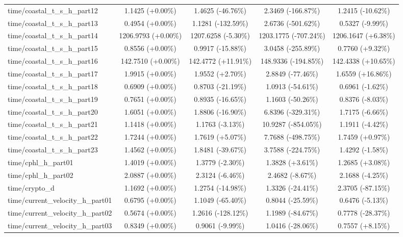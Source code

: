 \begin{table}[htbp]
{\begin{tabular}{lcccc}
time/coastal\_t\_s\_h\_part12 & 1.1425 (+0.00\%) & 1.4625 (-46.76\%) & 2.3469 (-166.87\%) & 1.2415 (-10.62\%) \\
time/coastal\_t\_s\_h\_part13 & 0.4954 (+0.00\%) & 1.1281 (-132.59\%) & 2.6736 (-501.62\%) & 0.5327 (-9.99\%) \\
time/coastal\_t\_s\_h\_part14 & 1206.9793 (+0.00\%) & 1207.6258 (-5.30\%) & 1203.1775 (-707.24\%) & 1206.1647 (+6.38\%) \\
time/coastal\_t\_s\_h\_part15 & 0.8556 (+0.00\%) & 0.9917 (-15.88\%) & 3.0458 (-255.89\%) & 0.7760 (+9.32\%) \\
time/coastal\_t\_s\_h\_part16 & 142.7510 (+0.00\%) & 142.4772 (+11.91\%) & 148.9336 (-194.85\%) & 142.4338 (+10.65\%) \\
time/coastal\_t\_s\_h\_part17 & 1.9915 (+0.00\%) & 1.9552 (+2.70\%) & 2.8849 (-77.46\%) & 1.6559 (+16.86\%) \\
time/coastal\_t\_s\_h\_part18 & 0.6909 (+0.00\%) & 0.8703 (-21.19\%) & 1.0913 (-54.61\%) & 0.6961 (-1.62\%) \\
time/coastal\_t\_s\_h\_part19 & 0.7651 (+0.00\%) & 0.8935 (-16.65\%) & 1.1603 (-50.26\%) & 0.8376 (-8.03\%) \\
time/coastal\_t\_s\_h\_part20 & 1.6051 (+0.00\%) & 1.8806 (-16.90\%) & 6.8396 (-329.31\%) & 1.7175 (-6.66\%) \\
time/coastal\_t\_s\_h\_part21 & 1.1418 (+0.00\%) & 1.1763 (-3.13\%) & 10.9287 (-854.05\%) & 1.1911 (-4.42\%) \\
time/coastal\_t\_s\_h\_part22 & 1.7244 (+0.00\%) & 1.7619 (+5.07\%) & 7.7688 (-498.75\%) & 1.7459 (+0.97\%) \\
time/coastal\_t\_s\_h\_part23 & 1.4562 (+0.00\%) & 1.8481 (-39.67\%) & 3.7588 (-224.75\%) & 1.4292 (-1.58\%) \\
time/cphl\_h\_part01 & 1.4019 (+0.00\%) & 1.3779 (-2.30\%) & 1.3828 (+3.61\%) & 1.2685 (+3.08\%) \\
time/cphl\_h\_part02 & 2.0887 (+0.00\%) & 2.3124 (-6.46\%) & 2.4682 (-8.67\%) & 2.1688 (-4.25\%) \\
time/crypto\_d & 1.1692 (+0.00\%) & 1.2754 (-14.98\%) & 1.3326 (-24.41\%) & 2.3705 (-87.15\%) \\
time/current\_velocity\_h\_part01 & 0.6795 (+0.00\%) & 1.1049 (-65.40\%) & 0.8044 (-25.59\%) & 0.6476 (-5.13\%) \\
time/current\_velocity\_h\_part02 & 0.5674 (+0.00\%) & 1.2616 (-128.12\%) & 1.1989 (-84.67\%) & 0.7778 (-28.37\%) \\
time/current\_velocity\_h\_part03 & 0.8349 (+0.00\%) & 0.9061 (-9.99\%) & 1.0416 (-28.06\%) & 0.7557 (+8.15\%) \\

\end{tabular}}
\end{table}
